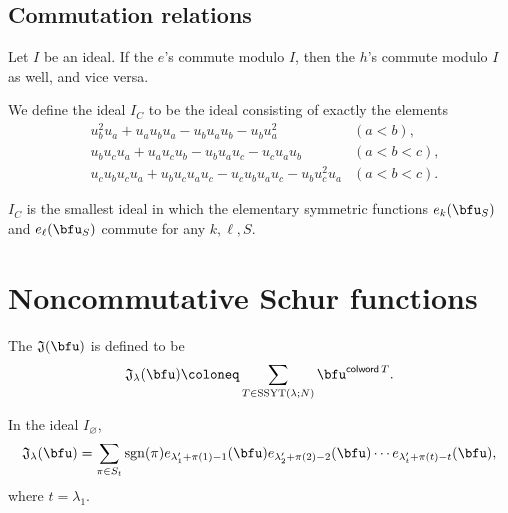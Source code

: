 \documentclass{article}
\newcommand*\colword{\operatorname{\mathsf{colword}}}
\newcommand*\frkJ{\mathfrak{J}}
\newcommand*\SSYT{\operatorname{SSYT}}
\newcommand*\sgn{\operatorname{sgn}}
\begin{document}
\subsection{Commutation relations}

\begin{lemma}
    Let $I$ be an ideal.
    If the $e$'s commute modulo $I$, then the $h$'s commute modulo $I$ as well, and vice versa.
\end{lemma}

\begin{definition}
    We define the ideal $I_C$ to be the ideal consisting of exactly the elements
    \begin{align}
        &
        u_b^2u_a + u_au_bu_a - u_bu_au_b - u_bu_a^2 
        &
        (a<b),
        \\
        &
        u_bu_cu_a + u_au_cu_b - u_bu_au_c - u_cu_au_b
        &
        (a<b<c),
        \\
        &
        u_cu_bu_cu_a + u_bu_cu_au_c - u_cu_bu_au_c - u_bu_c^2u_a
        &
        (a<b<c).
    \end{align}
\end{definition}

\begin{theorem}
    $I_C$ is the smallest ideal in which the elementary symmetric functions $e_k(\bfu_S)$ and $e_\ell(\bfu_S)$ commute for any $k,\ell,S$.
\end{theorem}

\section{
    Noncommutative Schur functions
}

\begin{definition}
    The  $\frkJ(\bfu)$ is defined to be
    \[
        \frkJ_\lambda(\bfu)
        \coloneq
        \sum_{T \in \SSYT(\lambda;N)}
        \bfu^{\colword T}.
    \]
\end{definition}

\begin{theorem}
    In the ideal $I_\varnothing$,
    \[
        \frkJ_\lambda(\bfu)
        =
        \sum_{\pi \in S_{t}}
        \sgn(\pi)
        e_{\lambda'_1+\pi(1)-1}(\bfu)
        e_{\lambda'_2+\pi(2)-2}(\bfu)
        \cdots
        e_{\lambda'_{t}+\pi(t)-t}(\bfu),
    \]
    where $t = \lambda_1$.
\end{theorem}
\end{document}
